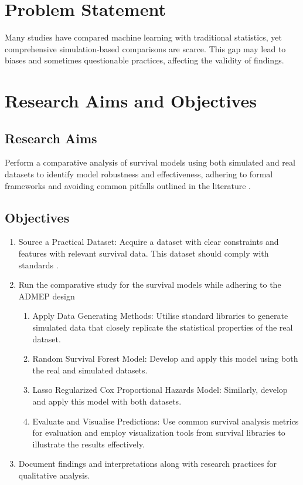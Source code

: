 \section{Problem Statement}
\noindent Many studies have compared machine learning with traditional statistics, yet comprehensive simulation-based comparisons are scarce. This gap may lead to biases and sometimes questionable practices, affecting the validity of findings.

\section{Research Aims and Objectives}
\subsection{Research Aims}
\noindent Perform a comparative analysis of survival models using both simulated and real datasets to identify model robustness and effectiveness, adhering to formal frameworks \parencite{morris_using_2019} and avoiding common pitfalls outlined in the literature \parencite{pawel_pitfalls_2024}.
\subsection{Objectives}
\begin{enumerate}
    \item Source a Practical Dataset: Acquire a dataset with clear constraints and features with relevant survival data. This dataset should comply with standards \parencite{wilkinson_fair_2016}. 
    \item Run the comparative study for the survival models while adhering to the ADMEP design \parencite{morris_using_2019}
    \begin{enumerate}
        \item Apply Data Generating Methods: Utilise standard libraries to generate simulated data that closely replicate the statistical properties of the real dataset.
        \item Random Survival Forest Model: Develop and apply this model using both the real and simulated datasets.
        \item Lasso Regularized Cox Proportional Hazards Model: Similarly, develop and apply this model with both datasets.
        \item Evaluate and Visualise Predictions: Use common survival analysis metrics for evaluation and employ visualization tools from survival libraries to illustrate the results effectively.
    \end{enumerate}
    \item Document findings and interpretations along with research practices for qualitative analysis.
\end{enumerate}
 
